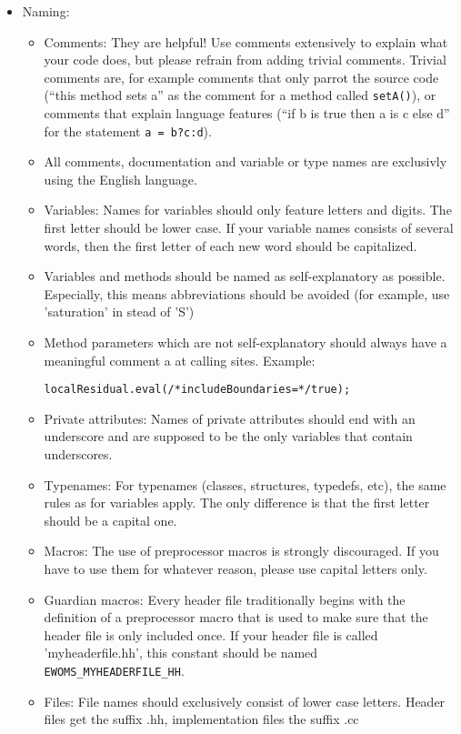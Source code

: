 \begin{itemize}
\item Naming: 
\begin{itemize}
\item Comments: They are helpful! Use comments extensively to explain
  what your code does, but please refrain from adding trivial
  comments. Trivial comments are, for example comments that only
  parrot the source code (``this method sets a'' as the comment for a
  method called \texttt{setA()}), or comments that explain language
  features (``if b is true then a is c else d'' for the statement
  \texttt{a = b?c:d}).
\item All comments, documentation and variable or type names are
  exclusivly using the English language.
\item Variables: Names for variables should only feature letters and
  digits. The first letter should be lower case. If your variable
  names consists of several words, then the first letter of each new
  word should be capitalized.
\item Variables and methods should be named as self-explanatory as
  possible. Especially, this means abbreviations should be avoided
  (for example, use 'saturation' in stead of 'S')
\item Method parameters which are not self-explanatory should always
  have a meaningful comment a at calling sites. Example:
\begin{lstlisting}[style=eWomsCode]
   localResidual.eval(/*includeBoundaries=*/true);
\end{lstlisting}
\item Private attributes: Names of private attributes should end with
  an underscore and are supposed to be the only variables that contain
  underscores.
\item Typenames: For typenames (classes, structures, typedefs, etc),
  the same rules as for variables apply. The only difference is that
  the first letter should be a capital one.
\item Macros: The use of preprocessor macros is strongly
  discouraged. If you have to use them for whatever reason, please use
  capital letters only.
\item Guardian macros: Every header file traditionally begins with the
  definition of a preprocessor macro that is used to make sure that
  the header file is only included once. If your header file is
  called 'myheaderfile.hh', this constant should be named
  \texttt{EWOMS\_MYHEADERFILE\_HH}.
\item Files: File names should exclusively consist of lower case
  letters. Header files get the suffix .hh, implementation files the
  suffix .cc
\end{itemize}


\end{itemize}
